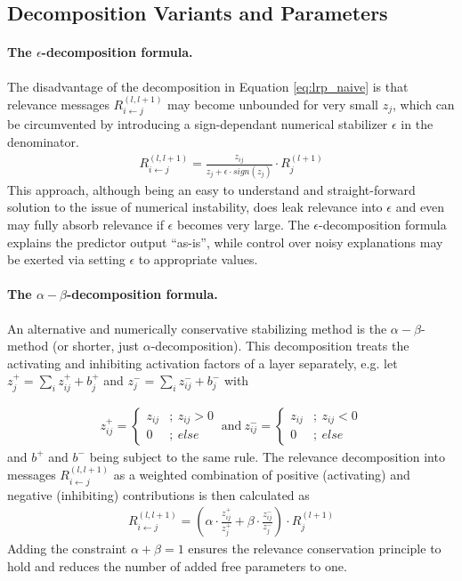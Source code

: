 \documentclass[a4wide]{article}
\begin{document}
\subsection*{Decomposition Variants and Parameters}
\paragraph{The $\epsilon$-decomposition formula.}
The disadvantage of the decomposition in Equation \ref{eq:lrp_naive} is that relevance messages $R^{(l,l+1)}_{i\leftarrow j}$ may become unbounded for very small $z_j$, which can be circumvented by introducing a sign-dependant numerical stabilizer $\epsilon$ in the denominator.
\begin{align}
R^{(l,l+1)}_{i\leftarrow j} = \frac{z_{ij}}{z_j + \epsilon \cdot sign(z_j)}\cdot R_j^{(l+1)}
\label{eq:lrp_epsilon}
\end{align}
This approach, although being an easy to understand and straight-forward solution to the issue of numerical instability, does leak relevance into $\epsilon$ and even may fully absorb relevance if $\epsilon$ becomes very large.
The $\epsilon$-decomposition formula explains the predictor output ``as-is'', while control over noisy explanations may be exerted via setting $\epsilon$ to appropriate values.

\paragraph{The $\alpha-\beta$-decomposition formula.}
An alternative and numerically conservative stabilizing method is the $\alpha-\beta$-method (or shorter, just $\alpha$-decomposition).
This decomposition treats the activating and inhibiting activation factors of a layer separately, e.g. let $z_j^+ = \sum_i z^+_{ij} + b^+_j$ and $z_j^- = \sum_i z^-_{ij} + b^-_j$ with 

\begin{align}
z^+_{ij} = \begin{cases} z_{ij} &;~ z_{ij} > 0 \\ 0  &;~ else \end{cases}
~\text{and}~
z^-_{ij} = \begin{cases} z_{ij} &;~ z_{ij} < 0 \\ 0  &;~ else \end{cases}
\end{align}
and $b^+$ and $b^-$ being subject to the same rule.
The relevance decomposition into messages $R_{i \leftarrow j}^{(l,l+1)}$ as a weighted combination of positive (activating) and negative (inhibiting) contributions is then calculated as
\begin{align}
R^{(l,l+1)}_{i\leftarrow j} = \left(\alpha\cdot\frac{z_{ij}^+}{z_j^+} + \beta\cdot\frac{z_{ij}^-}{z_j^-}\right)\cdot R_j^{(l+1)}
\label{eq:lrp_alphabeta}
\end{align}
Adding the constraint $\alpha + \beta = 1$ ensures the relevance conservation principle to hold and reduces the number of added free parameters to one.
\end{document}

